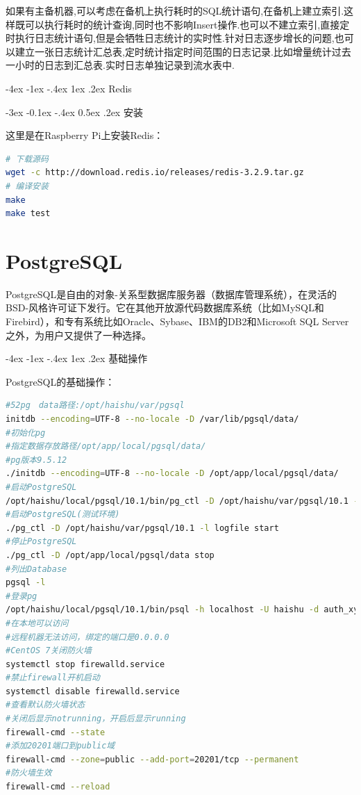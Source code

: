 \documentclass[12pt]{book}
\makeatletter
\numberwithin{dummy}{section}
\theoremstyle{ocrenumbox}
\theoremstyle{blacknumex}
\theoremstyle{blacknumbox}
\theoremstyle{ocrenum}
\renewcommand{\section}{\@startsection{section}{1}{\z@}
	{-4ex \@plus -1ex \@minus -.4ex}
	{1ex \@plus.2ex }
	{\normalfont\large\sffamily\bfseries}}
\renewcommand{\subsection}{\@startsection {subsection}{2}{\z@}
	{-3ex \@plus -0.1ex \@minus -.4ex}
	{0.5ex \@plus.2ex }
	{\normalfont\sffamily\bfseries}}
\makeatother
\begin{document}
如果有主备机器,可以考虑在备机上执行耗时的SQL统计语句,在备机上建立索引.这样既可以执行耗时的统计查询,同时也不影响Insert操作\cite{highperformancesql}.也可以不建立索引,直接定时执行日志统计语句,但是会牺牲日志统计的实时性.针对日志逐步增长的问题,也可以建立一张日志统计汇总表,定时统计指定时间范围的日志记录.比如增量统计过去一小时的日志到汇总表.实时日志单独记录到流水表中.



\section{Redis}

\subsection{安装}

这里是在Raspberry Pi上安装Redis：

\begin{lstlisting}[language=Bash]
# 下载源码
wget -c http://download.redis.io/releases/redis-3.2.9.tar.gz
# 编译安装
make
make test
\end{lstlisting}


\chapter{PostgreSQL}

PostgreSQL是自由的对象-关系型数据库服务器（数据库管理系统），在灵活的BSD-风格许可证下发行。它在其他开放源代码数据库系统（比如MySQL和Firebird），和专有系统比如Oracle、Sybase、IBM的DB2和Microsoft SQL Server之外，为用户又提供了一种选择。

\section{基础操作}

PostgreSQL的基础操作：

\begin{lstlisting}[language=Bash]
#52pg　data路径:/opt/haishu/var/pgsql
initdb --encoding=UTF-8 --no-locale -D /var/lib/pgsql/data/
#初始化pg
#指定数据存放路径/opt/app/local/pgsql/data/
#pg版本9.5.12
./initdb --encoding=UTF-8 --no-locale -D /opt/app/local/pgsql/data/
#启动PostgreSQL
/opt/haishu/local/pgsql/10.1/bin/pg_ctl -D /opt/haishu/var/pgsql/10.1 -l logfile start
#启动PostgreSQL(测试环境)
./pg_ctl -D /opt/haishu/var/pgsql/10.1 -l logfile start
#停止PostgreSQL
./pg_ctl -D /opt/app/local/pgsql/data stop
#列出Database
pgsql -l
#登录pg
/opt/haishu/local/pgsql/10.1/bin/psql -h localhost -U haishu -d auth_xycq
#在本地可以访问
#远程机器无法访问，绑定的端口是0.0.0.0
#CentOS 7关闭防火墙
systemctl stop firewalld.service
#禁止firewall开机启动
systemctl disable firewalld.service
#查看默认防火墙状态
#关闭后显示notrunning，开启后显示running
firewall-cmd --state
#添加20201端口到public域
firewall-cmd --zone=public --add-port=20201/tcp --permanent
#防火墙生效
firewall-cmd --reload
\end{lstlisting}
\end{document}
